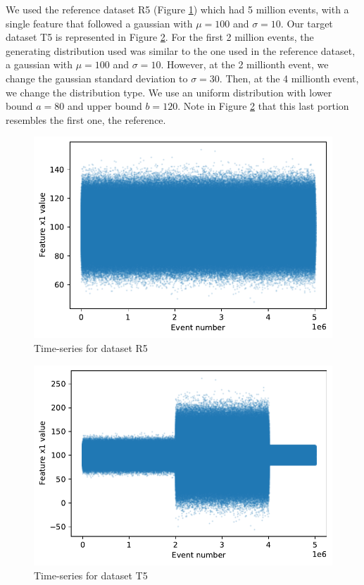 \documentclass[sigconf]{acmart}
\begin{document}
We used the reference dataset R5 (Figure \ref{fig:timeseries-r5}) which had 5 million events, with a single feature that followed a gaussian with  $\mu=100$ and $\sigma=10$. Our target dataset T5 is represented in Figure \ref{fig:timeseries-t5}. For the first 2 million events, the generating distribution used was similar to the one used in the reference dataset, a gaussian with $\mu=100$ and $\sigma=10$. However, at the 2 millionth event, we change the gaussian standard deviation to $\sigma=30$. Then, at the 4 millionth event, we change the distribution type. We use an uniform distribution with lower bound $a=80$ and upper bound $b=120$. Note in Figure \ref{fig:timeseries-t5} that this last portion resembles the first one, the reference.
\begin{figure}[!htb]
    \begin{center}
      \includegraphics[scale=0.5]{figures/timeseries-r5.pdf}
      \caption{Time-series for dataset R5}
      \label{fig:timeseries-r5}
    \end{center}
\end{figure}
\begin{figure}[!htb]
    \begin{center}
      \includegraphics[scale=0.5]{figures/timeseries-t5.pdf}
      \caption{Time-series for dataset T5}
     \label{fig:timeseries-t5}
    \end{center}
\end{figure}
\end{document}

